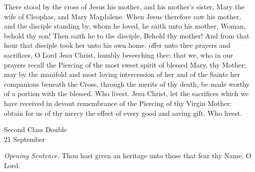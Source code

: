  There stood by the cross of Jesus his mother, and his mother's sister, Mary the wife of Cleophas, and Mary Magdalene. When Jesus therefore saw his mother, and the disciple standing by, whom he loved, he saith unto his mother, Woman, behold thy son! Then saith he to the disciple, Behold thy mother! And from that hour that disciple took her unto his own home.
\clearpage
{}
\secret
{} offer unto thee prayers and sacrifices, O Lord Jesu Christ, humbly beseeching thee: that we, who in our prayers recall the Piercing of the most sweet spirit of blessed Mary, thy Mother; may by the manifold and most loving intercession of her and of the Saints her companions beneath the Cross, through the merits of thy death, be made worthy of a portion with the blessed. Who livest.
\postcommunion
{} Jesu Christ, let the sacrifices which we have received in devout remembrance of the Piercing of thy Virgin Mother: obtain for us of thy mercy the effect of every good and saving gift. Who livest.


\begin{inhead}
    {Second Class Double\\
21 September}
\end{inhead}
\par\noindent
\textit{Opening Sentence.} Thou hast given an heritage unto those that fear thy Name, O Lord.%



